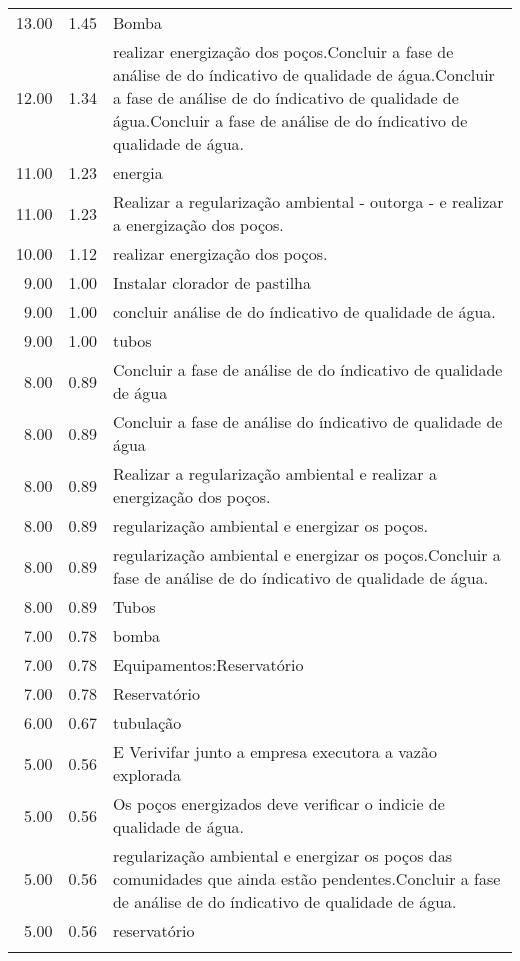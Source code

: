\documentclass[a4paper, 12pt, openright, oneside, english, brazil, article]{abntex2}
\begin{document}
\begin{scriptsize}
\begin{longtable}{rrp{11cm}}
			13.00 & 1.45 & Bomba \\ 
			12.00 & 1.34 & realizar energização dos poços.Concluir a fase de análise de do índicativo de qualidade de água.Concluir a fase de análise de do índicativo de qualidade de água.Concluir a fase de análise de do índicativo de qualidade de água. \\ 
			11.00 & 1.23 & energia \\ 
			11.00 & 1.23 & Realizar a regularização ambiental -  outorga -  e realizar a energização dos poços. \\ 
			10.00 & 1.12 & realizar energização dos poços. \\ 
			9.00 & 1.00 &  Instalar clorador de pastilha \\ 
			9.00 & 1.00 & concluir análise de do índicativo de qualidade de água. \\ 
			9.00 & 1.00 & tubos \\ 
			8.00 & 0.89 & Concluir a fase de análise de do índicativo de qualidade de água \\ 
			8.00 & 0.89 & Concluir a fase de análise do índicativo de qualidade de água \\ 
			8.00 & 0.89 & Realizar a regularização ambiental e realizar a energização dos poços. \\ 
			8.00 & 0.89 & regularização ambiental e energizar os poços. \\ 
			8.00 & 0.89 & regularização ambiental e energizar os poços.Concluir a fase de análise de do índicativo de qualidade de água. \\ 
			8.00 & 0.89 & Tubos \\ 
			7.00 & 0.78 & bomba \\ 
			7.00 & 0.78 & Equipamentos:Reservatório \\ 
			7.00 & 0.78 & Reservatório \\ 
			6.00 & 0.67 & tubulação \\ 
			5.00 & 0.56 & E Verivifar junto a empresa executora a vazão explorada \\ 
			5.00 & 0.56 & Os poços energizados deve verificar o indicie de qualidade de água. \\ 
			5.00 & 0.56 & regularização ambiental e energizar os poços das comunidades que ainda estão pendentes.Concluir a fase de análise de do índicativo de qualidade de água. \\ 
			5.00 & 0.56 & reservatório \\
			\hline
			\hline
			\label{propostas}
		\end{longtable}
	\end{scriptsize}
\end{document}
